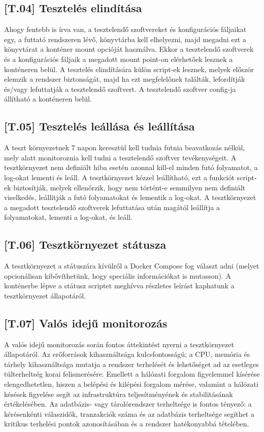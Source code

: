 \documentclass{scrreprt}
\begin{document}
\subsection{[T.04] Tesztelés elindítása} \label{T.04}
Ahogy fentebb is írva van, a tesztelendő szoftvereket és konfigurációs fáljaikat egy, a futtató rendszeren lévő, könyvtárba kell elhelyezni, majd megadni ezt a
könyvtárat a konténer mount opcióját használva. Ekkor a tesztelendő szoftverek és a konfigurációs fáljaik a megadott mount point-on elérhetőek lesznek a
konténeren belül. \newline A tesztelés elindítására külön script-ek lesznek, melyek először elemzik a rendszer biztonságát, majd ha ezt megfelelőnek találták,
lefordítják és/vagy lefuttatják a tesztelendő szoftvert. A tesztelendő szoftver config-ja állítható a konténeren belül.

\subsection{[T.05] Tesztelés leállása és leállítása} \label{T.05}
A teszt környezetnek 7 napon keresztül kell tudnia futnia beavatkozás nélkül, mely alatt monitoroznia kell tudni a tesztelendő szoftver tevékenységeit. A
tesztkörnyezet nem definiált hiba esetén azonnal kill-el minden futó folyamatot, a log-okat lementi és leáll. A tesztkörnyezet kézzel leállítható, ezt a
funkciót script-ek biztosítják, melyek ellenőrzik, hogy nem történt-e semmilyen nem definiált viselkedés, leállítják a futó folyamatokat és lementik a
log-okat. A tesztkörnyezet a megadott tesztelendő szoftverek lefuttatása után magától leállítja a folyamatokat, lementi a log-okat, és leáll.

\subsection{[T.06] Tesztkörnyezet státusza} \label{T.06}
A tesztkörnyezet a státuszára kívülről a Docker Compose fog választ adni (melyet opcionálisan kibővíthetünk, hogy speciális információkat is mutasson). A
konténerbe lépve a státusz scriptet meghívva részletes leírást kaphatunk a tesztkörnyezet állapotáról.

\subsection{[T.07] Valós idejű monitorozás} \label{T.07}
A valós idejű monitorozás során fontos áttekintést nyerni a tesztkörnyezet állapotáról. Az erőforrások kihasználtsága kulcsfontosságú; a CPU, memória és
tárhely kihasználtsága mutatja a rendszer terhelését és lehetőséget ad az esetleges túlterheltség korai felismerésére. Emellett a hálózati forgalom figyelemmel
kísérése elengedhetetlen, hiszen a belépési és kilépési forgalom mérése, valamint a hálózati késések figyelése segít az infrastruktúra teljesítményének és
stabilitásának értékelésében. Az adatbázis- vagy tárolórendszer terheltsége is fontos tényező: a kérésenkénti válaszidők, tranzakciók száma és az adatbázis
terheltsége segíthet a kritikus terhelési pontok azonosításában és a rendszer hatékonyabbá tételében.
\end{document}
